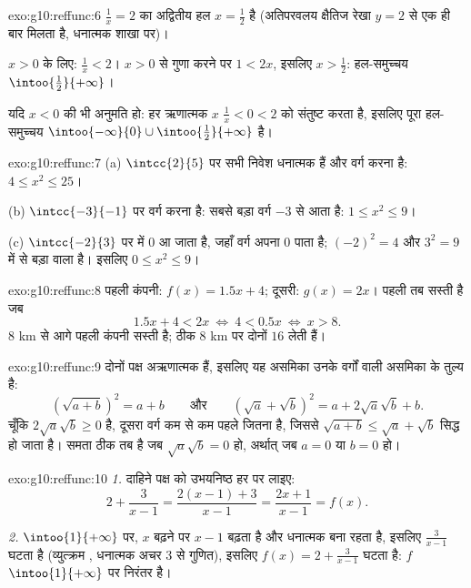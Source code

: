 \begin{solution}{exo:g10:reffunc:6}
$\frac1x = 2$ का अद्वितीय हल $x = \frac12$ है (अतिपरवलय क्षैतिज रेखा $y = 2$ से एक ही बार मिलता
है, धनात्मक शाखा पर)।

$x > 0$ के लिए: $\frac1x < 2$। $x > 0$ से गुणा करने पर $1 < 2x$, इसलिए $x > \frac12$: हल-समुच्चय $\intoo{\frac12}{+\infty}$।

यदि $x < 0$ की भी अनुमति हो: हर ऋणात्मक $x$ $\frac1x < 0 < 2$ को संतुष्ट करता है, इसलिए
पूरा हल-समुच्चय $\intoo{-\infty}{0} \cup \intoo{\frac12}{+\infty}$ है।
\end{solution}

\begin{solution}{exo:g10:reffunc:7}
(a) $\intcc{2}{5}$ पर सभी निवेश धनात्मक हैं और वर्ग करना  है: $4 \leq x^2 \leq 25$।

(b) $\intcc{-3}{-1}$ पर वर्ग करना  है: सबसे बड़ा वर्ग $-3$ से आता है: $1 \leq x^2 \leq 9$।

(c) $\intcc{-2}{3}$ पर  में $0$ आ जाता है, जहाँ वर्ग अपना  $0$ पाता है;
 $(-2)^2 = 4$ और $3^2 = 9$ में से बड़ा वाला है। इसलिए $0 \leq x^2 \leq 9$।
\end{solution}

\begin{solution}{exo:g10:reffunc:8}
पहली कंपनी: $f(x) = 1.5x + 4$; दूसरी: $g(x) = 2x$। पहली तब सस्ती है जब
\[
1.5x + 4 < 2x
\ \Longleftrightarrow\
4 < 0.5x
\ \Longleftrightarrow\
x > 8 .
\]
$8$ km से आगे पहली कंपनी सस्ती है; ठीक $8$ km पर दोनों $16$ लेती हैं।
\end{solution}

\begin{solution}{exo:g10:reffunc:9}
दोनों पक्ष अऋणात्मक हैं, इसलिए यह असमिका उनके वर्गों वाली असमिका के तुल्य
है:
\[
\left(\sqrt{a+b}\right)^2 = a + b
\qquad\text{और}\qquad
\left(\sqrt a + \sqrt b\right)^2 = a + 2\sqrt a \sqrt b + b .
\]
चूँकि $2\sqrt a\sqrt b \geq 0$ है, दूसरा वर्ग कम से कम पहले जितना है, जिससे $\sqrt{a+b} \leq \sqrt a + \sqrt b$ सिद्ध हो जाता
है। समता ठीक तब है जब $\sqrt a \sqrt b = 0$ हो, अर्थात् जब $a = 0$ या $b = 0$ हो।
\end{solution}

\begin{solution}{exo:g10:reffunc:10}
\emph{1.} दाहिने पक्ष को उभयनिष्ठ हर पर लाइए:
\[
2 + \frac{3}{x-1} = \frac{2(x-1) + 3}{x - 1} = \frac{2x + 1}{x - 1}
= f(x).
\]

\emph{2.} $\intoo{1}{+\infty}$ पर, $x$ बढ़ने पर $x - 1$ बढ़ता है और धनात्मक बना रहता है,
इसलिए $\frac{3}{x-1}$ घटता है (व्युत्क्रम , धनात्मक अचर $3$ से गुणित), इसलिए
$f(x) = 2 + \frac{3}{x-1}$ घटता है: $f$ $\intoo{1}{+\infty}$ पर निरंतर  है।
\end{solution}

